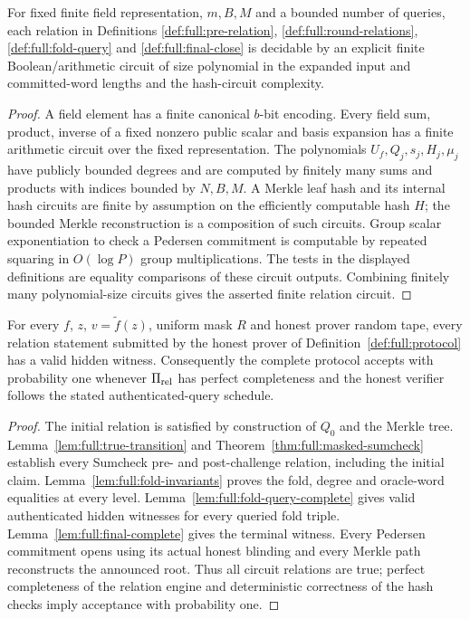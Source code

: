 \begin{lemma}\label{lem:full:circuits}
For fixed finite field representation,
$m,B,M$ and a bounded number of queries,
each relation in Definitions
\ref{def:full:pre-relation},
\ref{def:full:round-relations},
\ref{def:full:fold-query} and
\ref{def:full:final-close}
is decidable by an explicit finite
Boolean/arithmetic circuit of
size polynomial in the expanded
input and committed-word lengths
and the hash-circuit complexity.
\end{lemma}
\begin{proof}
A field element has a finite
canonical $b$-bit encoding.
Every field sum, product, inverse
of a fixed nonzero public scalar
and basis expansion has a finite
arithmetic circuit over the fixed
representation. The polynomials
$U_f,Q_j,s_j,H_j,\mu_j$ have
publicly bounded degrees and
are computed by finitely many
sums and products with indices
bounded by $N,B,M$. A Merkle
leaf hash and its internal
hash circuits are finite by
assumption on the efficiently
computable hash $H$; the
bounded Merkle reconstruction
is a composition of such
circuits. Group scalar
exponentiation to check a
Pedersen commitment is
computable by repeated
squaring in $O(\log P)$
group multiplications.
The tests in the displayed
definitions are equality
comparisons of these circuit
outputs. Combining finitely
many polynomial-size circuits
gives the asserted finite
relation circuit.
\end{proof}

\begin{theorem}\label{thm:full:completeness}
For every $f$, $z$,
$v=\widetilde f(z)$, uniform
mask $R$ and honest prover
random tape, every relation
statement submitted by the
honest prover of
Definition~\ref{def:full:protocol}
has a valid hidden witness.
Consequently the complete
protocol accepts with
probability one whenever
$\Pi_{\rm rel}$ has perfect
completeness and the honest
verifier follows the stated
authenticated-query schedule.
\end{theorem}
\begin{proof}
The initial relation is
satisfied by construction of
$Q_0$ and the Merkle tree.
Lemma~\ref{lem:full:true-transition}
and Theorem~\ref{thm:full:masked-sumcheck}
establish every Sumcheck
pre- and post-challenge
relation, including the
initial claim. Lemma~\ref{lem:full:fold-invariants}
proves the fold, degree and
oracle-word equalities at
every level.
Lemma~\ref{lem:full:fold-query-complete}
gives valid authenticated
hidden witnesses for every
queried fold triple.
Lemma~\ref{lem:full:final-complete}
gives the terminal witness.
Every Pedersen commitment
opens using its actual honest
blinding and every Merkle path
reconstructs the announced root.
Thus all circuit relations
are true; perfect completeness
of the relation engine
and deterministic correctness
of the hash checks imply
acceptance with probability one.
\end{proof}

